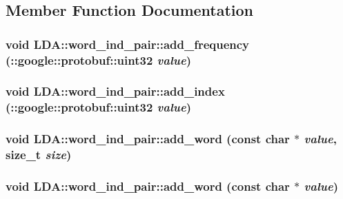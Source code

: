 \subsection{Member Function Documentation}
\hypertarget{class_l_d_a_1_1word__ind__pair_a0156a95fe97af94ebe3454090f3161dd}{
\subsubsection[{add\_\-frequency}]{\setlength{\rightskip}{0pt plus 5cm}void LDA::word\_\-ind\_\-pair::add\_\-frequency (::google::protobuf::uint32 {\em value})}}
\label{class_l_d_a_1_1word__ind__pair_a0156a95fe97af94ebe3454090f3161dd}
\hypertarget{class_l_d_a_1_1word__ind__pair_a4b2ce0d0631bf196e552db1e803b6173}{
\subsubsection[{add\_\-index}]{\setlength{\rightskip}{0pt plus 5cm}void LDA::word\_\-ind\_\-pair::add\_\-index (::google::protobuf::uint32 {\em value})}}
\label{class_l_d_a_1_1word__ind__pair_a4b2ce0d0631bf196e552db1e803b6173}
\hypertarget{class_l_d_a_1_1word__ind__pair_abdfcb44dce9d365517d48d403e51e274}{
\subsubsection[{add\_\-word}]{\setlength{\rightskip}{0pt plus 5cm}void LDA::word\_\-ind\_\-pair::add\_\-word (const char $\ast$ {\em value}, \/  size\_\-t {\em size})}}
\label{class_l_d_a_1_1word__ind__pair_abdfcb44dce9d365517d48d403e51e274}
\hypertarget{class_l_d_a_1_1word__ind__pair_a25b0e19ff1b7e74131b6b19a7ddd9e39}{
\subsubsection[{add\_\-word}]{\setlength{\rightskip}{0pt plus 5cm}void LDA::word\_\-ind\_\-pair::add\_\-word (const char $\ast$ {\em value})}}
